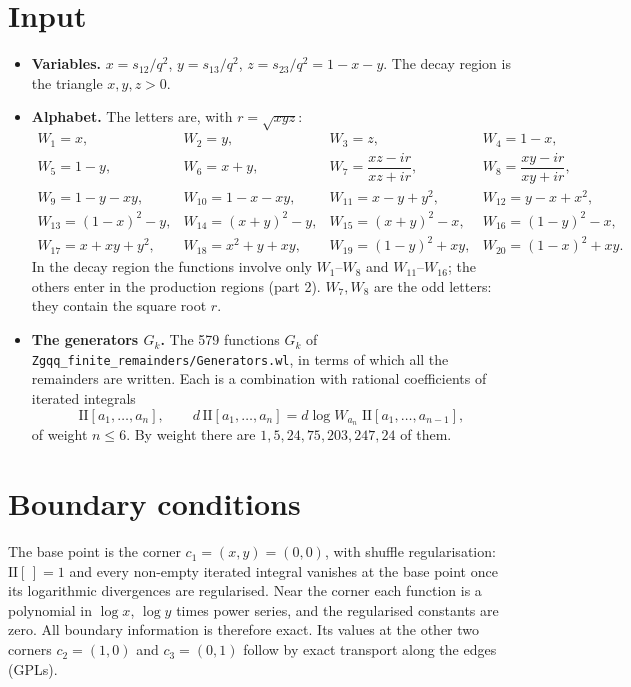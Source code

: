 \documentclass[11pt]{article}
\newcommand{\II}{\mathrm{II}}
\begin{document}
\section{Input}
\begin{itemize}
\item \textbf{Variables.} $x=s_{12}/q^2$, $y=s_{13}/q^2$, $z=s_{23}/q^2=1-x-y$. The decay region is the triangle
  $x,y,z>0$.
\item \textbf{Alphabet.} The letters are, with $r=\sqrt{xyz}$:
\[
\begin{array}{llll}
W_1=x, & W_2=y, & W_3=z, & W_4=1-x,\\
W_5=1-y, & W_6=x+y, & W_7=\dfrac{xz-ir}{xz+ir}, & W_8=\dfrac{xy-ir}{xy+ir},\\[2mm]
W_9=1-y-xy, & W_{10}=1-x-xy, & W_{11}=x-y+y^2, & W_{12}=y-x+x^2,\\
W_{13}=(1-x)^2-y, & W_{14}=(x+y)^2-y, & W_{15}=(x+y)^2-x, & W_{16}=(1-y)^2-x,\\
W_{17}=x+xy+y^2, & W_{18}=x^2+y+xy, & W_{19}=(1-y)^2+xy, & W_{20}=(1-x)^2+xy.
\end{array}
\]
  In the decay region the functions involve only $W_1$--$W_8$ and $W_{11}$--$W_{16}$; the others enter in the
  production regions (part 2). $W_7,W_8$ are the odd letters: they contain the square root $r$.
\item \textbf{The generators $G_k$.} The 579 functions $G_k$ of \texttt{Zgqq\_finite\_remainders/Generators.wl},
  in terms of which all the remainders are written. Each is a combination with rational coefficients of iterated
  integrals
  \[
    \II[a_1,\dots,a_n],\qquad d\,\II[a_1,\dots,a_n]=d\log W_{a_n}\;\II[a_1,\dots,a_{n-1}],
  \]
  of weight $n\le6$. By weight there are $1,5,24,75,203,247,24$ of them.
\end{itemize}

\section{Boundary conditions}
The base point is the corner $c_1=(x,y)=(0,0)$, with shuffle regularisation: $\II[\,]=1$ and every non-empty iterated
integral vanishes at the base point once its logarithmic divergences are regularised. Near the corner each function is
a polynomial in $\log x$, $\log y$ times power series, and the regularised constants are zero. All boundary
information is therefore exact. Its values at the other two corners $c_2=(1,0)$ and $c_3=(0,1)$ follow by exact
transport along the edges (GPLs).
\end{document}
